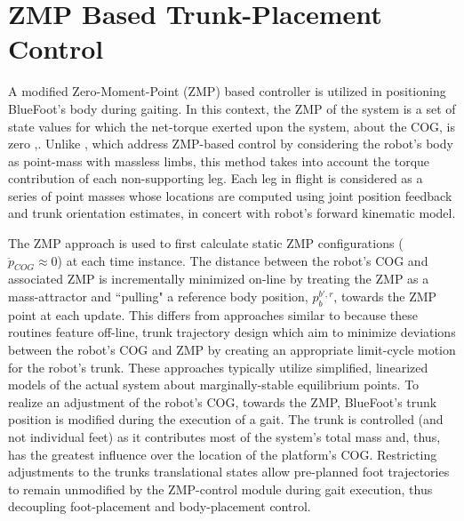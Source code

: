 	\section{ZMP Based Trunk-Placement Control}

		A  modified Zero-Moment-Point (ZMP) based controller is utilized in positioning BlueFoot's body during gaiting. In this context, the ZMP of the system is a set of state values for which the net-torque exerted upon the system, about the COG, is zero \cite{Kajita2003},\cite{Katie2009}. Unlike \cite{Takanishi1989,Kurazume2003}, which address ZMP-based control by considering the robot's body as point-mass with massless limbs, this method takes into account the torque contribution of each non-supporting leg. Each leg in flight is considered as a series of point masses whose locations are computed using joint position feedback and trunk orientation estimates, in concert with robot's forward kinematic model.
		
		The ZMP approach is used to first calculate static ZMP configurations ( \IE $\ddot{p}_{COG}\approx0$) at each time instance. The distance between the robot's COG and associated ZMP is incrementally minimized on-line by treating the ZMP as a  mass-attractor and ``pulling" a reference body position, ${p}_{b}^{b',r}$, towards the ZMP point at each update. This differs from approaches similar to \cite{Kurazume2003} because these routines feature off-line, trunk trajectory design which aim to minimize deviations between the robot's COG and ZMP by creating an appropriate limit-cycle motion for the robot's trunk. These approaches typically utilize simplified, linearized models of the actual system about marginally-stable equilibrium points. To realize an adjustment of the robot's COG, towards the ZMP, BlueFoot's trunk position is modified during the execution of a gait. The trunk is controlled (and not individual feet) as it contributes most of the system's total mass and, thus, has the greatest influence over the location of the platform's COG. Restricting adjustments to the trunks translational states allow pre-planned foot trajectories to remain unmodified by the ZMP-control module during gait execution, thus decoupling foot-placement and body-placement control.

